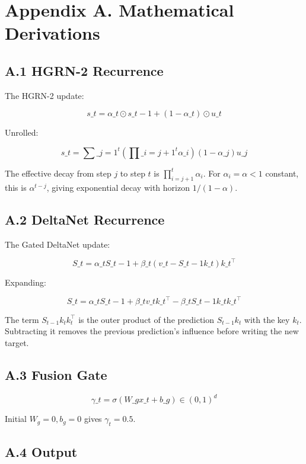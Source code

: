 \section{Appendix A. Mathematical Derivations}

\subsection{A.1 HGRN-2 Recurrence}

The HGRN-2 update:

\[
s\_t = \alpha\_t \odot s\_{t-1} + (1 - \alpha\_t) \odot u\_t
\tag{A.1}
\]

Unrolled:

\[
s\_t = \sum\_{j=1}^{t} \left( \prod\_{i=j+1}^{t} \alpha\_i \right) (1 - \alpha\_j) u\_j
\tag{A.2}
\]

The effective decay from step $j$ to step $t$ is $\prod_{i=j+1}^t \alpha_i$. 
For $\alpha_i = \alpha < 1$ constant, this is $\alpha^{t-j}$, giving 
exponential decay with horizon $1/(1-\alpha)$.

\subsection{A.2 DeltaNet Recurrence}

The Gated DeltaNet update:

\[
S\_t = \alpha\_t S\_{t-1} + \beta\_t (v\_t - S\_{t-1} k\_t) k\_t^\top
\tag{A.3}
\]

Expanding:

\[
S\_t = \alpha\_t S\_{t-1} + \beta\_t v\_t k\_t^\top - \beta\_t S\_{t-1} k\_t k\_t^\top
\tag{A.4}
\]

The term $S_{t-1} k_t k_t^\top$ is the outer product of the prediction 
$S_{t-1} k_t$ with the key $k_t$. Subtracting it removes the previous 
prediction's influence before writing the new target.

\subsection{A.3 Fusion Gate}

\[
\gamma\_t = \sigma(W\_g x\_t + b\_g) \in (0, 1)^d
\tag{A.5}
\]

Initial $W_g = 0, b_g = 0$ gives $\gamma_t = 0.5$.

\subsection{A.4 Output}

